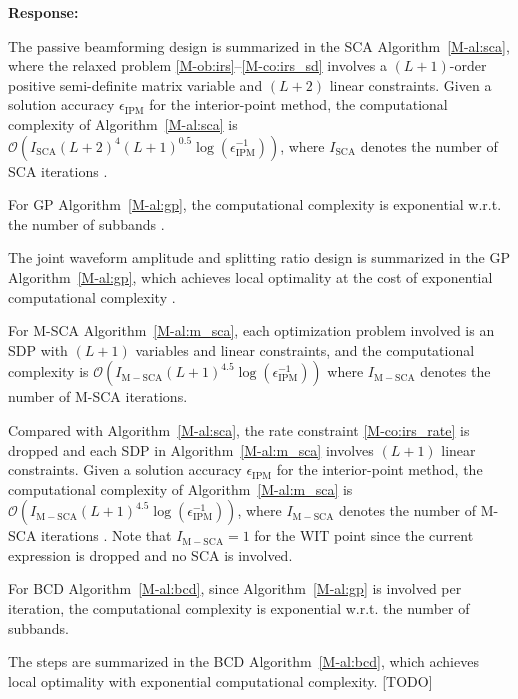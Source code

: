 \documentclass{article}
\newcounter{reviewer}
\newcounter{point}[reviewer]
\newcounter{response}[reviewer]
\newenvironment{response}
	{\refstepcounter{response} \medskip \noindent \textbf{Response:}\ }
	{\medskip}
\begin{document}
\begin{reviewer}
\begin{response}
			\begin{framed}
				The passive beamforming design is summarized in the SCA Algorithm~\ref{M-al:sca}, where the relaxed problem \eqref{M-ob:irs}--\eqref{M-co:irs_sd} involves a $(L+1)$-order positive semi-definite matrix variable and $(L+2)$ linear constraints. Given a solution accuracy $\epsilon_{\mathrm{IPM}}$ for the interior-point method, the computational complexity of Algorithm~\ref{M-al:sca} is $\mathcal{O}\left(I_{\mathrm{SCA}}(L+2)^4 (L+1)^{0.5} \log(\epsilon_{\mathrm{IPM}}^{-1})\right)$, where $I_{\mathrm{SCA}}$ denotes the number of SCA iterations \cite{M-Luo2010}.
			\end{framed}

			For GP Algorithm~\ref{M-al:gp}, the computational complexity is exponential w.r.t. the number of subbands \cite{M-Chiang2005}.
			\begin{framed}
				The joint waveform amplitude and splitting ratio design is summarized in the GP Algorithm~\ref{M-al:gp}, which achieves local optimality at the cost of exponential computational complexity \cite{M-Chiang2005}.
			\end{framed}

			For M-SCA Algorithm~\ref{M-al:m_sca}, each optimization problem involved is an SDP with $(L+1)$ variables and linear constraints, and the computational complexity is $\mathcal{O}\left(I_{\mathrm{M-SCA}}(L+1)^{4.5} \log(\epsilon_{\mathrm{IPM}}^{-1})\right)$ where $I_{\mathrm{M-SCA}}$ denotes the number of M-SCA iterations.
			\begin{framed}
				Compared with Algorithm~\ref{M-al:sca}, the rate constraint \eqref{M-co:irs_rate} is dropped and each SDP in Algorithm~\ref{M-al:m_sca} involves $(L+1)$ linear constraints. Given a solution accuracy $\epsilon_{\mathrm{IPM}}$ for the interior-point method, the computational complexity of Algorithm~\ref{M-al:m_sca} is $\mathcal{O}\left(I_{\mathrm{M-SCA}}(L+1)^{4.5} \log(\epsilon_{\mathrm{IPM}}^{-1})\right)$, where $I_{\mathrm{M-SCA}}$ denotes the number of M-SCA iterations \cite{M-Luo2010}. Note that $I_{\mathrm{M-SCA}}=1$ for the WIT point since the current expression is dropped and no SCA is involved.
			\end{framed}

			For BCD Algorithm~\ref{M-al:bcd}, since Algorithm~\ref{M-al:gp} is involved per iteration, the computational complexity is exponential w.r.t. the number of subbands.
			\begin{framed}
				The steps are summarized in the BCD Algorithm~\ref{M-al:bcd}, which achieves local optimality with exponential computational complexity. [TODO]
			\end{framed}


\end{response}
\end{reviewer}
\end{document}
